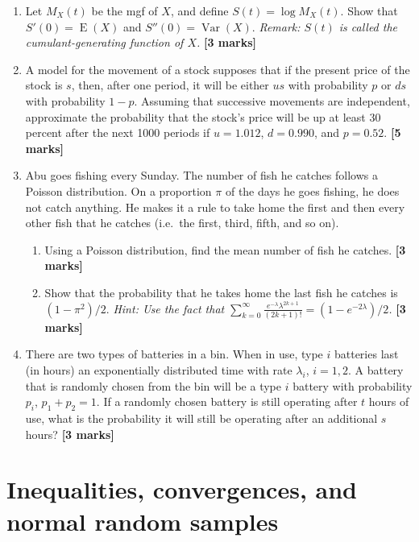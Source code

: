 \documentclass[
]{book}
\DeclareMathOperator{\E}{E}
\DeclareMathOperator{\Var}{Var}
\theoremstyle{definition}
\theoremstyle{definition}
\theoremstyle{definition}
\theoremstyle{definition}
\theoremstyle{remark}
\begin{document}
\begin{enumerate}
\def\labelenumi{\arabic{enumi}.}
\item
  Let \(M_X(t)\) be the mgf of \(X\), and define \(S(t) = \log M_X(t)\). Show that \(S'(0)= \E(X)\) and \(S''(0)= \Var(X)\). \emph{Remark: \(S(t)\) is called the cumulant-generating function of \(X\).} \textbf{{[}3 marks{]}}
\item
  A model for the movement of a stock supposes that if the present price of the stock is \(s\), then, after one period, it will be either \(us\) with probability \(p\) or \(ds\) with probability \(1-p\). Assuming that successive movements are independent, approximate the probability that the stock's price will be up at least 30 percent after the next 1000 periods if \(u = 1.012\), \(d = 0.990\), and \(p = 0.52\). \textbf{{[}5 marks{]}}
\item
  Abu goes fishing every Sunday. The number of fish he catches follows a Poisson distribution. On a proportion \(\pi\) of the days he goes fishing, he does not catch anything. He makes it a rule to take home the first and then every other fish that he catches (i.e.~the first, third, fifth, and so on).

  \begin{enumerate}
  \def\labelenumii{(\alph{enumii})}
  \item
    Using a Poisson distribution, find the mean number of fish he catches. \textbf{{[}3 marks{]}}
  \item
    Show that the probability that he takes home the last fish he catches is \((1-\pi^2)/2\). \emph{Hint: Use the fact that \(\sum_{k=0}^\infty\frac{e^{-\lambda}\lambda^{2k+1}}{(2k+1)!}=(1-e^{-2\lambda})/2\).} \textbf{{[}3 marks{]}}
  \end{enumerate}
\item
  There are two types of batteries in a bin. When in use, type \(i\) batteries last (in hours) an exponentially distributed time with rate \(\lambda_i\), \(i=1,2\). A battery that is randomly chosen from the bin will be a type \(i\) battery with probability \(p_i\), \(p_1+p_2=1\). If a randomly chosen battery is still operating after \(t\) hours of use, what is the probability it will still be operating after an additional \(s\) hours? \textbf{{[}3 marks{]}}
\end{enumerate}

\hypertarget{inequalities-convergences-and-normal-random-samples}{%
\chapter{Inequalities, convergences, and normal random samples}\label{inequalities-convergences-and-normal-random-samples}}
\end{document}
